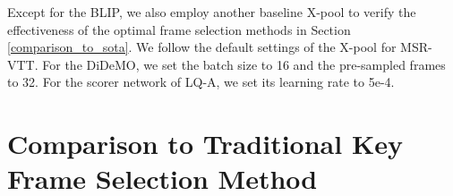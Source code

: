 \documentclass[11pt]{article}
\begin{document}
Except for the BLIP, we also employ another baseline X-pool \cite{gorti2022x} to verify the effectiveness of the optimal frame selection methods in Section \ref{comparison_to_sota}.
We follow the default settings of the X-pool for MSR-VTT.
For the DiDeMO, we set the batch size to 16 and the pre-sampled frames to 32.
For the scorer network of LQ-A, we set its learning rate to 5e-4.

\section{Comparison to Traditional Key Frame Selection Method}
\label{comparison between ours and the past technology}

\begin{table} \scriptsize
\setlength{\abovecaptionskip}{0.2cm}
\begin{center}
{\caption{Performance comparison between ours Redun-A+LQ-A and Katna on DiDeMo. 
Both methods are designed to eliminate redundant and low-quality frames.
}\label{comparison between tradition with ours}}
\end{center}
\vspace{-0.6cm}
\end{table}
\end{document}
